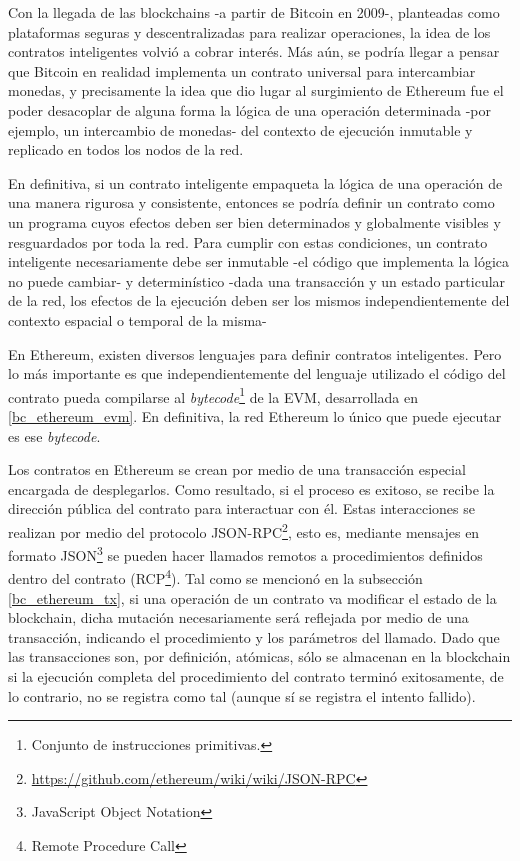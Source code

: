 Con la llegada de las blockchains -a partir de Bitcoin en 2009-, planteadas como plataformas seguras y descentralizadas para realizar operaciones, la idea de los contratos inteligentes volvió a cobrar interés. Más aún, se podría llegar a pensar que Bitcoin en realidad implementa un contrato universal para intercambiar monedas, y precisamente la idea que dio lugar al surgimiento de Ethereum fue el poder desacoplar de alguna forma la lógica de una operación determinada -por ejemplo, un intercambio de monedas- del contexto de ejecución inmutable y replicado en todos los nodos de la red.

En definitiva, si un contrato inteligente empaqueta la lógica de una operación de una manera rigurosa y consistente, entonces se podría definir un contrato como un programa cuyos efectos deben ser bien determinados y globalmente visibles y resguardados por toda la red. Para cumplir con estas condiciones, un contrato inteligente necesariamente debe ser inmutable -el código que implementa la lógica no puede cambiar- y determinístico -dada una transacción y un estado particular de la red, los efectos de la ejecución deben ser los mismos independientemente del contexto espacial o temporal de la misma-

En Ethereum, existen diversos lenguajes para definir contratos inteligentes. Pero lo más importante es que independientemente del lenguaje utilizado el código del contrato pueda compilarse al \textit{bytecode}\footnote{Conjunto de instrucciones primitivas.} de la EVM, desarrollada en \ref{bc_ethereum_evm}. En definitiva, la red Ethereum lo único que puede ejecutar es ese \textit{bytecode}.

Los contratos en Ethereum se crean por medio de una transacción especial encargada de desplegarlos. Como resultado, si el proceso es exitoso, se recibe la dirección pública del contrato para interactuar con él. Estas interacciones se realizan por medio del protocolo JSON-RPC\footnote{\url{https://github.com/ethereum/wiki/wiki/JSON-RPC}}, esto es, mediante mensajes en formato JSON\footnote{JavaScript Object Notation} se pueden hacer llamados remotos a procedimientos definidos dentro del contrato (RCP\footnote{Remote Procedure Call}). Tal como se mencionó en la subsección \ref{bc_ethereum_tx}, si una operación de un contrato va modificar el estado de la blockchain, dicha mutación necesariamente será reflejada por medio de una transacción, indicando el procedimiento y los parámetros del llamado. Dado que las transacciones son, por definición, atómicas, sólo se almacenan en la blockchain si la ejecución completa del procedimiento del contrato terminó exitosamente, de lo contrario, no se registra como tal (aunque sí se registra el intento fallido).

